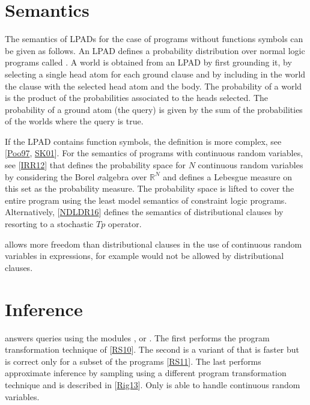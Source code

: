 \documentclass[letterpaper,10pt,english]{sphinxmanual}
\begin{document}
\chapter{Semantics}
\label{\detokenize{index:semantics}}
\sphinxAtStartPar
The semantics of LPADs for the case of programs without functions symbols can be given as follows.
An LPAD defines a probability distribution over normal logic programs called .
A world is obtained from an LPAD by first grounding it, by selecting a single head atom for each ground clause and by including in the world the clause with the selected head atom and the body.
The probability of a world is the product of the probabilities associated to the heads selected.
The probability of a ground atom (the query) is given by the sum of the probabilities of the worlds where the query is true.

\sphinxAtStartPar
If the LPAD contains function symbols, the definition is more complex, see {[}\hyperlink{cite.index:id54}{Poo97}, \hyperlink{cite.index:id55}{SK01}{]}.
For the semantics of programs with continuous random variables, see {[}\hyperlink{cite.index:id56}{IRR12}{]} that defines the probability space for \(N\) continuous random variables by considering the Borel \(\sigma\)\sphinxhyphen{}algebra over \(\mathbb{R}^N\) and defines a Lebesgue measure on this set as the probability measure.
The probability space is lifted to cover the entire program using the least model semantics of constraint logic programs.
Alternatively, {[}\hyperlink{cite.index:id53}{NDLDR16}{]} defines the semantics of distributional clauses by resorting to a stochastic \(Tp\) operator.

\sphinxAtStartPar
{} allows more freedom than distributional clauses in the use of continuous random variables in expressions,
for example  would not be allowed by distributional clauses.


\chapter{Inference}
\label{\detokenize{index:inference}}
\sphinxAtStartPar
{} answers queries using the modules ,  or .
The first performs the program transformation technique of {[}\hyperlink{cite.index:id57}{RS10}{]}.
The second is a variant of  that is faster but is correct only
for a subset of the programs {[}\hyperlink{cite.index:id74}{RS11}{]}.
The last performs approximate inference by sampling using a different program transformation technique and is described in {[}\hyperlink{cite.index:id58}{Rig13}{]}.
Only  is able to handle continuous random variables.
\end{document}
